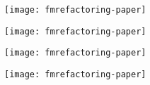 \documentclass{beamer}
\begin{document}
	\begin{frame}[plain]
		\texttt{[image: fmrefactoring-paper]}
	\end{frame}

	\begin{frame}[plain]
		\texttt{[image: fmrefactoring-paper]}
	\end{frame}

	\begin{frame}[plain]
		\texttt{[image: fmrefactoring-paper]}
	\end{frame}

	\begin{frame}[plain]
		\texttt{[image: fmrefactoring-paper]}
	\end{frame}
\end{document}
